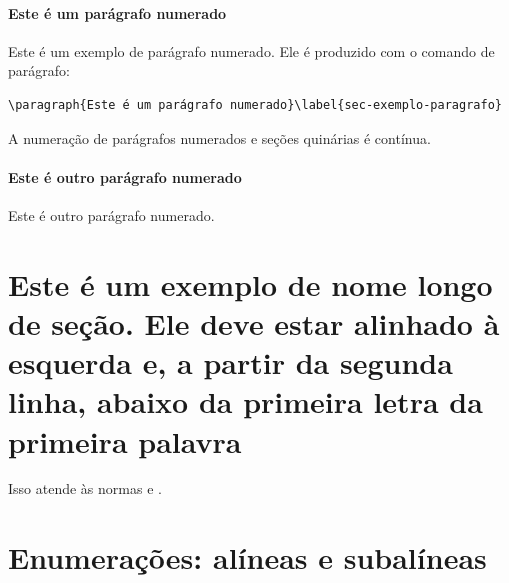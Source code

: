 \paragraph{Este é um parágrafo numerado}\label{sec-exemplo-paragrafo}

\noindent Este é um exemplo de parágrafo numerado. Ele é produzido com o comando de
parágrafo:

\begin{verbatim}
\paragraph{Este é um parágrafo numerado}\label{sec-exemplo-paragrafo}
\end{verbatim}

A numeração de parágrafos numerados e seções quinárias é contínua.

\paragraph{Este é outro parágrafo numerado}\label{sec-exemplo-paragrafo-outro}

\noindent Este é outro parágrafo numerado.

\section{Este é um exemplo de nome longo de seção. Ele deve estar alinhado à esquerda e, a partir da segunda linha, abaixo da primeira letra da primeira palavra}

Isso atende às normas  
 e .

\section{Enumerações: alíneas e subalíneas}

